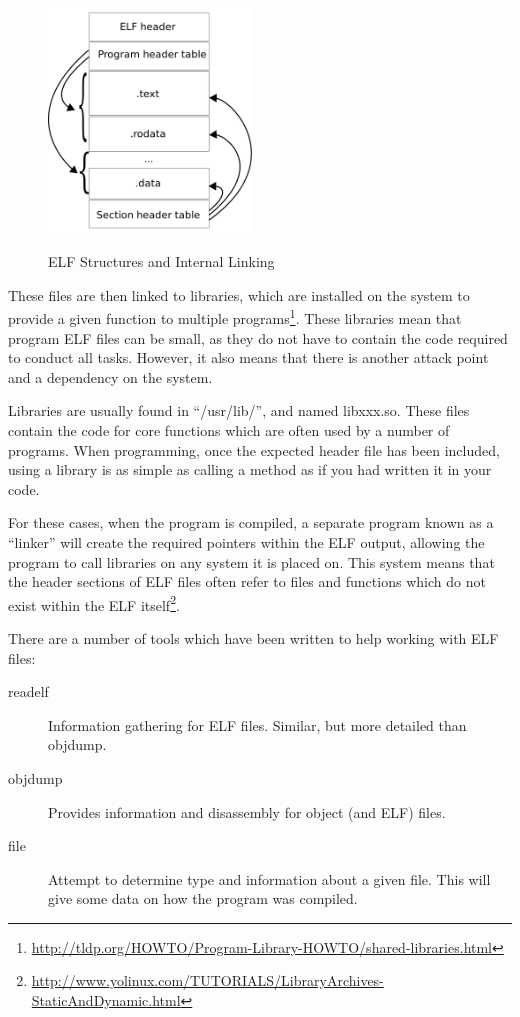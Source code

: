 			\begin{figure}
				\centering
				\vspace{-20pt}
				\includegraphics[width=0.48\textwidth]{./ELF.png}
				\label{fig:ELF}
				\caption{ELF Structures and Internal Linking}
			\end{figure}
			These files are then linked to libraries, which are installed on the system to provide a given function to multiple programs\footnote{\url{http://tldp.org/HOWTO/Program-Library-HOWTO/shared-libraries.html}}.
			These libraries mean that program ELF files can be small, as they do not have to contain the code required to conduct all tasks. 
			However, it also means that there is another attack point and a dependency on the system.

			Libraries are usually found in ``/usr/lib/'', and named libxxx.so. 
			These files contain the code for core functions which are often used by a number of programs. 
			When programming, once the expected header file has been included, using a library is as simple as calling a method as if you had written it in your code. 

			For these cases, when the program is compiled, a separate program known as a ``linker'' will create the required pointers within the ELF output, allowing the program to call libraries on any system it is placed on. 
			This system means that the header sections of ELF files often refer to files and functions which do not exist within the ELF itself\footnote{\url{http://www.yolinux.com/TUTORIALS/LibraryArchives-StaticAndDynamic.html}}. 
			\FloatBarrier

			There are a number of tools which have been written to help working with ELF files:
			\begin{description}
				\item[readelf] Information gathering for ELF files. 
					Similar, but more detailed than objdump. 
				\item[objdump] Provides information and disassembly for object (and ELF) files. 
				\item[file] Attempt to determine type and information about a given file. 
					This will give some data on how the program was compiled. 
			\end{description}

